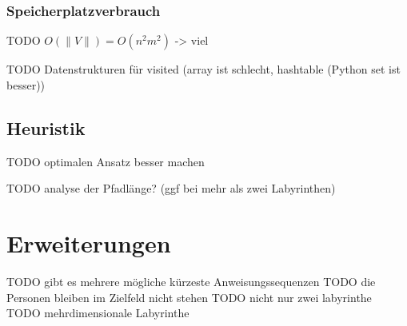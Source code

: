 \documentclass[a4paper,10pt,ngerman]{scrartcl}
\begin{document}
\subsubsection{Speicherplatzverbrauch}
TODO $O(\| V \|) = O(n^2 m^2)$ -> viel


TODO Datenstrukturen für visited (array ist schlecht, hashtable (Python set ist besser))




\subsection{Heuristik} TODO optimalen Ansatz besser machen


TODO analyse der Pfadlänge? (ggf bei mehr als zwei Labyrinthen)


\section{Erweiterungen}
TODO gibt es mehrere mögliche kürzeste Anweisungssequenzen
TODO die Personen bleiben im Zielfeld nicht stehen
TODO nicht nur zwei labyrinthe
TODO mehrdimensionale Labyrinthe
\end{document}
